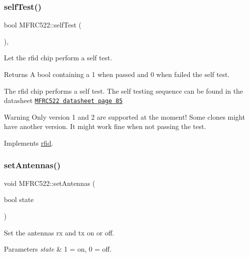 \subsubsection{\texorpdfstring{self\+Test()}{selfTest()}}
{\footnotesize\ttfamily bool M\+F\+R\+C522\+::self\+Test (\begin{DoxyParamCaption}{ }\end{DoxyParamCaption})\hspace{0.3cm}{\ttfamily [override]}, {\ttfamily [virtual]}}



Let the rfid chip perform a self test. 

\begin{DoxyReturn}{Returns}
A bool containing a 1 when passed and 0 when failed the self test.
\end{DoxyReturn}
The rfid chip performs a self test. The self testing sequence can be found in the datasheet \href{https://www.nxp.com/docs/en/data-sheet/MFRC522.pdf}{\tt M\+F\+R\+C522 datasheet page 85} \begin{DoxyWarning}{Warning}
Only version 1 and 2 are supported at the moment! Some clones might have another version. It might work fine when not passing the test. 
\end{DoxyWarning}


Implements \mbox{\hyperlink{classrfid_a93e5430380a14fd652e7ca1ce6443198}{rfid}}.

\mbox{\label{class_m_f_r_c522_ad33cc8218440b30747fba97aa59c0583}} 
\subsubsection{\texorpdfstring{set\+Antennas()}{setAntennas()}}
{\footnotesize\ttfamily void M\+F\+R\+C522\+::set\+Antennas (\begin{DoxyParamCaption}\item[{bool}]{state }\end{DoxyParamCaption})\hspace{0.3cm}{\ttfamily [protected]}}



Set the antennas rx and tx on or off. 


\begin{DoxyParams}{Parameters}
{\em state} & 1 = on, 0 = off. \\
\hline
\end{DoxyParams}
\mbox{\label{class_m_f_r_c522_ae30686cdd50f6fdb821908a2547e5153}} 
